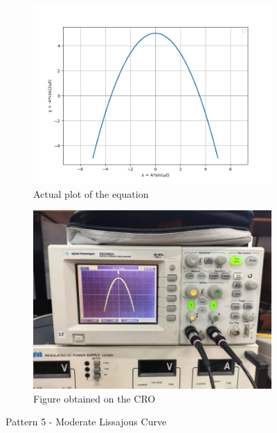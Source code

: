 \documentclass[12pt]{article}
\begin{document}
\begin{figure}[htbp]
    \centering
    \begin{subfigure}[b]{0.45\textwidth}
        \centering
        \includegraphics[width=\textwidth]{figs/Experiment-1/Observation-5/Figure_1.jpg}
        \caption{Actual plot of the equation}
    \end{subfigure}
    \hfill
    \begin{subfigure}[b]{0.45\textwidth}
        \centering
        \includegraphics[width=\textwidth]{figs/Experiment-1/Observation-5/Figure_2.png}
        \caption{Figure obtained on the CRO}
    \end{subfigure}
    \caption{Pattern 5 - Moderate Lissajous Curve}
\end{figure}
\end{document}
